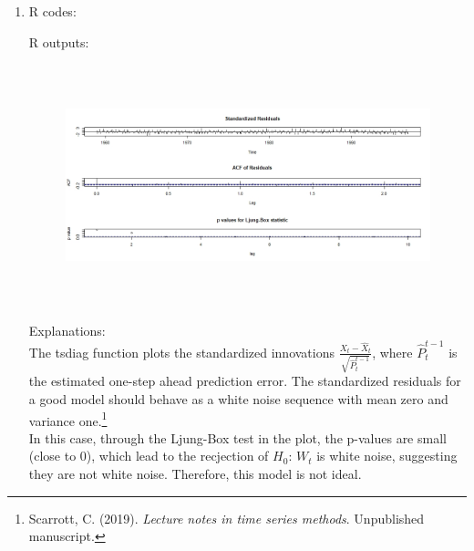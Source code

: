 \documentclass[10pt]{article}
\begin{document}
\begin{enumerate}[1)]
\item
R codes:

R outputs:
\begin{figure}[H]
  \centering
  \includegraphics[width=12cm,height=7cm]{p45a.jpeg}
\end{figure}
Explanations:\\
The tsdiag function plots the standardized innovations $\frac{X_t-\hat{X}_t}{\sqrt{\hat{P}^{t-1}_t}}$, where $\hat{P}^{t-1}_t$ is the estimated one-step ahead prediction error. The standardized residuals for a good model should behave as a white noise sequence with mean zero and variance one.\footnote{ Scarrott, C. (2019). \textit{Lecture notes in time series methods}. Unpublished manuscript.}\\
In this case, through the Ljung-Box test in the plot, the p-values are small (close to 0), which lead to the recjection of $H_0$: $W_t$ is white noise, suggesting they are not white noise. Therefore, this model is not ideal.

\end{enumerate}
\end{document}

